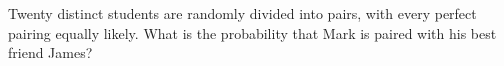 Twenty distinct students are randomly divided into pairs, with every perfect pairing equally likely. What is the probability that Mark is paired with his best friend James?

